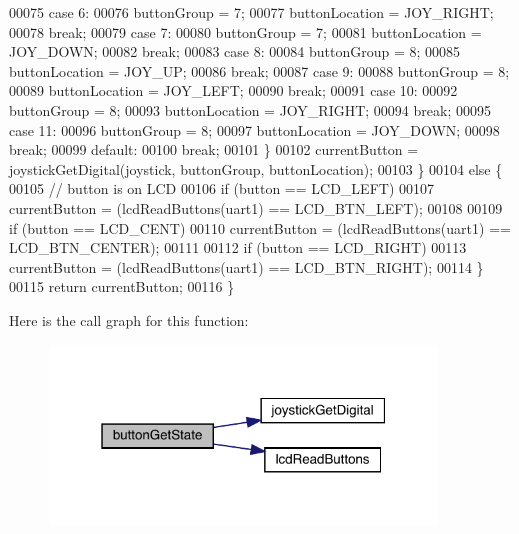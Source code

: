 \begin{DoxyCode}
00075         \textcolor{keywordflow}{case} 6:
00076             buttonGroup = 7;
00077             buttonLocation = JOY_RIGHT;
00078             \textcolor{keywordflow}{break};
00079         \textcolor{keywordflow}{case} 7:
00080             buttonGroup = 7;
00081             buttonLocation = JOY_DOWN;
00082             \textcolor{keywordflow}{break};
00083         \textcolor{keywordflow}{case} 8:
00084             buttonGroup = 8;
00085             buttonLocation = JOY_UP;
00086             \textcolor{keywordflow}{break};
00087         \textcolor{keywordflow}{case} 9:
00088             buttonGroup = 8;
00089             buttonLocation = JOY_LEFT;
00090             \textcolor{keywordflow}{break};
00091         \textcolor{keywordflow}{case} 10:
00092             buttonGroup = 8;
00093             buttonLocation = JOY_RIGHT;
00094             \textcolor{keywordflow}{break};
00095         \textcolor{keywordflow}{case} 11:
00096             buttonGroup = 8;
00097             buttonLocation = JOY_DOWN;
00098             \textcolor{keywordflow}{break};
00099         \textcolor{keywordflow}{default}:
00100             \textcolor{keywordflow}{break};
00101         \}
00102         currentButton = joystickGetDigital(joystick, buttonGroup, buttonLocation);
00103     \}
00104     \textcolor{keywordflow}{else} \{
00105         \textcolor{comment}{// button is on LCD}
00106         \textcolor{keywordflow}{if} (button == LCD_LEFT)
00107             currentButton = (lcdReadButtons(uart1) == LCD_BTN_LEFT);
00108 
00109         \textcolor{keywordflow}{if} (button == LCD_CENT)
00110             currentButton = (lcdReadButtons(uart1) == LCD_BTN_CENTER);
00111 
00112         \textcolor{keywordflow}{if} (button == LCD_RIGHT)
00113             currentButton = (lcdReadButtons(uart1) == LCD_BTN_RIGHT);
00114     \}
00115     \textcolor{keywordflow}{return} currentButton;
00116 \}
\end{DoxyCode}
Here is the call graph for this function\+:\nopagebreak
\begin{figure}[H]
\begin{center}
\leavevmode
\includegraphics[width=292pt]{toggle_8c_ad2b7c969a01f85d57bdca0bc7f5cff81_cgraph}
\end{center}
\end{figure}
